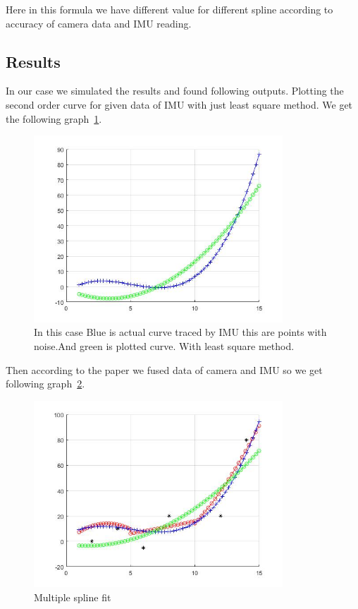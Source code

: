  Here in this formula we have different value for different spline according to accuracy of camera data and IMU reading.

\subsection{Results}
 
 In our case we simulated the results and found following outputs.
Plotting the second order curve for given data of IMU with just least square method. We get the following graph~\ref{imures1}.

\begin{figure}[!htb]
\includegraphics[width=\textwidth,height=7cm,keepaspectratio]{./figures/lsm.jpg}
\caption{In this case Blue is actual curve traced by IMU this are points with noise.And green is plotted curve. With least square method.}
\label{imures1}
\end{figure}

Then according to the paper we fused data of camera and IMU so we get following graph~\ref{fig:multipleSpline}.

\begin{figure}[!htb]
\includegraphics[width=\textwidth,height=7cm,keepaspectratio]{./figures/AllOutput.jpg}
\caption{Multiple spline fit}
\label{fig:multipleSpline}
\end{figure}

